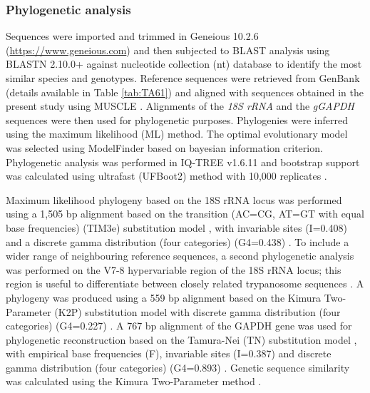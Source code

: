 \documentclass[a4paper, nobind]{templates/ociamthesis}
\begin{document}
\hypertarget{phylogenetic-analysis}{%
\subsubsection{Phylogenetic analysis}\label{phylogenetic-analysis}}

Sequences were imported and trimmed in Geneious 10.2.6 (\url{https://www.geneious.com}) and then subjected to BLAST analysis using BLASTN 2.10.0+ \autocite{zhangGreedyAlgorithmAligning2000} against nucleotide collection (nt) database \autocite{morgulisDatabaseIndexingProduction2008} to identify the most similar species and genotypes. Reference sequences were retrieved from GenBank \autocite{bensonGenBank2017} (details available in Table \ref{tab:TA61}) and aligned with sequences obtained in the present study using MUSCLE \autocite{edgarMUSCLEMultipleSequence2004}. Alignments of the \emph{18S rRNA} and the \emph{gGAPDH} sequences were then used for phylogenetic purposes. Phylogenies were inferred using the maximum likelihood (ML) method. The optimal evolutionary model was selected using ModelFinder \autocite{kalyaanamoorthyModelFinderFastModel2017} based on bayesian information criterion. Phylogenetic analysis was performed in IQ-TREE v1.6.11 \autocite{nguyenIQTREEFastEffective2015} and bootstrap support was calculated using ultrafast (UFBoot2) method with 10,000 replicates \autocite{hoangUFBoot2ImprovingUltrafast2018}.

Maximum likelihood phylogeny based on the 18S rRNA locus was performed using a 1,505 bp alignment based on the transition (AC=CG, AT=GT with equal base frequencies) (TIM3e) substitution model \autocite{posadaUsingMODELTESTPAUP2003}, with invariable sites (I=0.408) and a discrete gamma distribution (four categories) (G4=0.438) \autocite{guMaximumLikelihoodEstimation1995}. To include a wider range of neighbouring reference sequences, a second phylogenetic analysis was performed on the V7-8 hypervariable region of the 18S rRNA locus; this region is useful to differentiate between closely related trypanosome sequences \autocite{hamiltonResolvingRelationshipsAustralian2011}. A phylogeny was produced using a 559 bp alignment based on the Kimura Two-Parameter (K2P) substitution model \autocite{kimuraSimpleMethodEstimating1980} with discrete gamma distribution (four categories) (G4=0.227) \autocite{guMaximumLikelihoodEstimation1995}. A 767 bp alignment of the GAPDH gene was used for phylogenetic reconstruction based on the Tamura-Nei (TN) substitution model \autocite{tamuraEstimationNumberNucleotide1993}, with empirical base frequencies (F), invariable sites (I=0.387) and discrete gamma distribution (four categories) (G4=0.893) \autocite{guMaximumLikelihoodEstimation1995}. Genetic sequence similarity was calculated using the Kimura Two-Parameter method \autocite{tamuraEstimationNumberNucleotide1993}.
\end{document}
